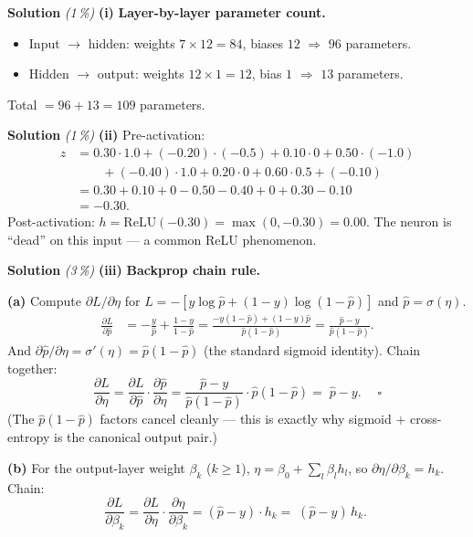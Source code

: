 \documentclass[11pt,a4paper]{article}
\newcommand{\subpoints}[1]{\textit{(#1\,\%)}}
\newcommand{\sol}{\noindent\textbf{Solution}}
\begin{document}
\sol{} \subpoints{1} \textbf{(i)} \textbf{Layer-by-layer parameter count.}
\begin{itemize}
  \item Input $\to$ hidden: weights $7\times 12 = 84$, biases $12$ $\Rightarrow$ $96$ parameters.
  \item Hidden $\to$ output: weights $12\times 1 = 12$, bias $1$ $\Rightarrow$ $13$ parameters.
\end{itemize}
Total $= 96 + 13 = \boxed{109}$ parameters.

\medskip
\sol{} \subpoints{1} \textbf{(ii)} Pre-activation:
\begin{align*}
z &= 0.30\cdot 1.0 + (-0.20)\cdot(-0.5) + 0.10\cdot 0 + 0.50\cdot(-1.0) \\
  &\qquad + (-0.40)\cdot 1.0 + 0.20\cdot 0 + 0.60\cdot 0.5 + (-0.10) \\
  &= 0.30 + 0.10 + 0 - 0.50 - 0.40 + 0 + 0.30 - 0.10 \\
  &= \boxed{-0.30}.
\end{align*}
Post-activation: $h = \mathrm{ReLU}(-0.30) = \max(0, -0.30) = \boxed{0.00}$. The neuron is
``dead'' on this input --- a common ReLU phenomenon.

\medskip
\sol{} \subpoints{3} \textbf{(iii)} \textbf{Backprop chain rule.}

\textbf{(a)} Compute $\partial L / \partial \eta$ for $L = -[y\log\hat p + (1-y)\log(1-\hat p)]$
and $\hat p = \sigma(\eta)$.
\begin{align*}
\frac{\partial L}{\partial \hat p}
   &= -\frac{y}{\hat p} + \frac{1-y}{1-\hat p}
    = \frac{-y(1-\hat p) + (1-y)\hat p}{\hat p(1-\hat p)}
    = \frac{\hat p - y}{\hat p(1-\hat p)}.
\end{align*}
And $\partial\hat p / \partial\eta = \sigma'(\eta) = \hat p(1-\hat p)$ (the standard sigmoid
identity). Chain together:
$$\frac{\partial L}{\partial \eta}
   = \frac{\partial L}{\partial \hat p}\cdot\frac{\partial \hat p}{\partial \eta}
   = \frac{\hat p - y}{\hat p(1-\hat p)}\cdot \hat p(1-\hat p)
   = \boxed{\;\hat p - y.\;}\quad\square$$
(The $\hat p(1-\hat p)$ factors cancel cleanly --- this is exactly why sigmoid + cross-entropy is
the canonical output pair.)

\textbf{(b)} For the output-layer weight $\beta_k$ ($k \ge 1$), $\eta = \beta_0 + \sum_{l}\beta_l h_l$,
so $\partial\eta / \partial\beta_k = h_k$. Chain:
$$\frac{\partial L}{\partial\beta_k}
   = \frac{\partial L}{\partial\eta}\cdot\frac{\partial\eta}{\partial\beta_k}
   = (\hat p - y)\cdot h_k
   = \boxed{\;(\hat p - y)\, h_k.\;}$$
\end{document}
